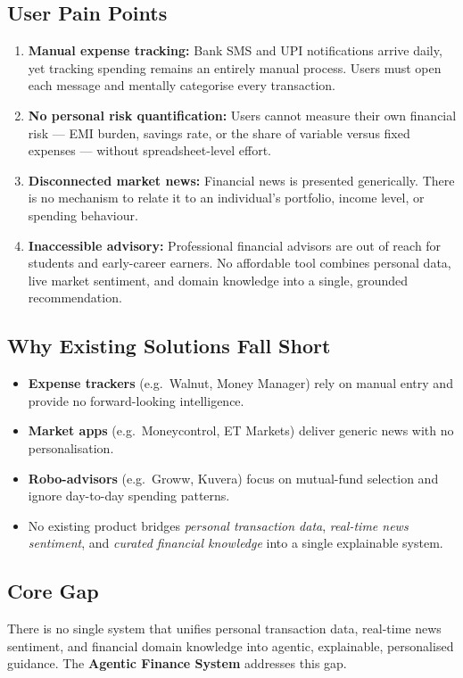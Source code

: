 \documentclass[12pt,a4paper]{article}
\begin{document}
\subsection{User Pain Points}
\begin{enumerate}[leftmargin=1.5em]
  \item \textbf{Manual expense tracking:} Bank SMS and UPI notifications arrive daily, yet tracking spending remains an entirely manual process. Users must open each message and mentally categorise every transaction.
  \item \textbf{No personal risk quantification:} Users cannot measure their own financial risk --- EMI burden, savings rate, or the share of variable versus fixed expenses --- without spreadsheet-level effort.
  \item \textbf{Disconnected market news:} Financial news is presented generically. There is no mechanism to relate it to an individual's portfolio, income level, or spending behaviour.
  \item \textbf{Inaccessible advisory:} Professional financial advisors are out of reach for students and early-career earners. No affordable tool combines personal data, live market sentiment, and domain knowledge into a single, grounded recommendation.
\end{enumerate}

\subsection{Why Existing Solutions Fall Short}
\begin{itemize}[leftmargin=1.5em]
  \item \textbf{Expense trackers} (e.g.\ Walnut, Money Manager) rely on manual entry and provide no forward-looking intelligence.
  \item \textbf{Market apps} (e.g.\ Moneycontrol, ET Markets) deliver generic news with no personalisation.
  \item \textbf{Robo-advisors} (e.g.\ Groww, Kuvera) focus on mutual-fund selection and ignore day-to-day spending patterns.
  \item No existing product bridges \emph{personal transaction data}, \emph{real-time news sentiment}, and \emph{curated financial knowledge} into a single explainable system.
\end{itemize}

\subsection{Core Gap}
There is no single system that unifies personal transaction data, real-time news sentiment, and financial domain knowledge into agentic, explainable, personalised guidance. The \textbf{Agentic Finance System} addresses this gap.
\end{document}
